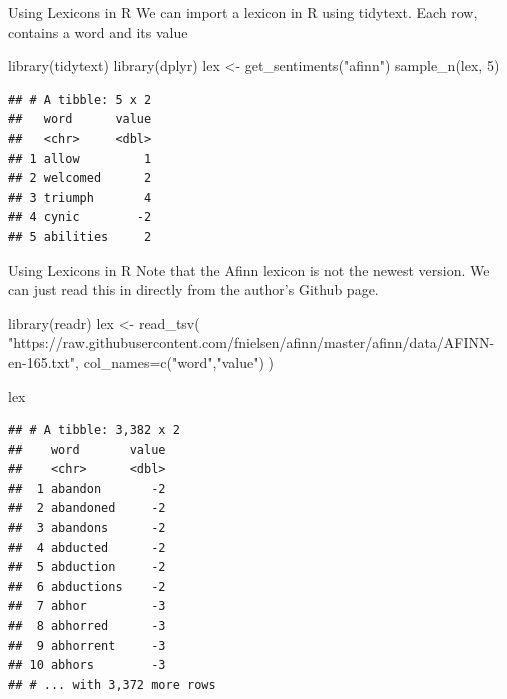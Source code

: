 \documentclass[
  10pt,
  ignorenonframetext,
  aspectratio=169]{beamer}
\newenvironment{Shaded}{\begin{snugshade}}{\end{snugshade}}
\newcommand{\AttributeTok}[1]{\textcolor[rgb]{0.80,0.80,0.80}{#1}}
\newcommand{\DecValTok}[1]{\textcolor[rgb]{0.86,0.86,0.80}{#1}}
\newcommand{\FunctionTok}[1]{\textcolor[rgb]{0.94,0.94,0.56}{#1}}
\newcommand{\NormalTok}[1]{\textcolor[rgb]{0.80,0.80,0.80}{#1}}
\newcommand{\OtherTok}[1]{\textcolor[rgb]{0.94,0.94,0.56}{#1}}
\newcommand{\StringTok}[1]{\textcolor[rgb]{0.80,0.58,0.58}{#1}}
\begin{document}
\begin{frame}[fragile]{Using Lexicons in R}
\protect\hypertarget{using-lexicons-in-r}{}
We can import a lexicon in R using tidytext. Each row, contains a word
and its value

\medskip

\begin{Shaded}
\begin{Highlighting}[]
\FunctionTok{library}\NormalTok{(tidytext)}
\FunctionTok{library}\NormalTok{(dplyr)}
\NormalTok{lex }\OtherTok{\textless{}{-}} \FunctionTok{get\_sentiments}\NormalTok{(}\StringTok{"afinn"}\NormalTok{)}
\FunctionTok{sample\_n}\NormalTok{(lex, }\DecValTok{5}\NormalTok{)}
\end{Highlighting}
\end{Shaded}

\begin{verbatim}
## # A tibble: 5 x 2
##   word      value
##   <chr>     <dbl>
## 1 allow         1
## 2 welcomed      2
## 3 triumph       4
## 4 cynic        -2
## 5 abilities     2
\end{verbatim}
\end{frame}

\begin{frame}[fragile]{Using Lexicons in R}
\protect\hypertarget{using-lexicons-in-r-1}{}
Note that the Afinn lexicon is not the newest version. We can just read
this in directly from the author's Github page.

\medskip

\begin{Shaded}
\begin{Highlighting}[]
\FunctionTok{library}\NormalTok{(readr)}
\NormalTok{lex }\OtherTok{\textless{}{-}} \FunctionTok{read\_tsv}\NormalTok{(}
  \StringTok{"https://raw.githubusercontent.com/fnielsen/afinn/master/afinn/data/AFINN{-}en{-}165.txt"}\NormalTok{,}
  \AttributeTok{col\_names=}\FunctionTok{c}\NormalTok{(}\StringTok{"word"}\NormalTok{,}\StringTok{"value"}\NormalTok{)}
\NormalTok{)}

\NormalTok{lex}
\end{Highlighting}
\end{Shaded}

\begin{verbatim}
## # A tibble: 3,382 x 2
##    word       value
##    <chr>      <dbl>
##  1 abandon       -2
##  2 abandoned     -2
##  3 abandons      -2
##  4 abducted      -2
##  5 abduction     -2
##  6 abductions    -2
##  7 abhor         -3
##  8 abhorred      -3
##  9 abhorrent     -3
## 10 abhors        -3
## # ... with 3,372 more rows
\end{verbatim}
\end{frame}
\end{document}

